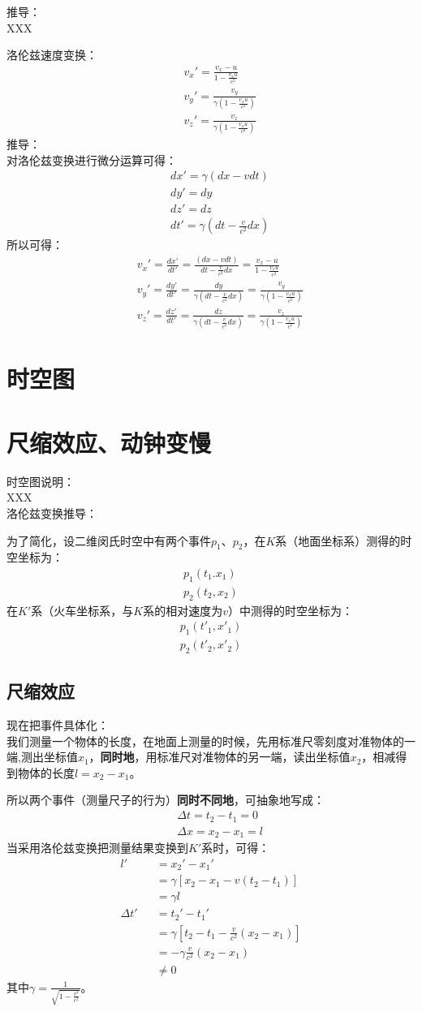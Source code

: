 \documentclass[11pt]{article}
\newcommand{\bea}{\setlength\arraycolsep{2pt} \begin{eqnarray}}
\newcommand{\eea}{\end{eqnarray}}
\numberwithin{equation}{section}
\begin{document}
\begin{CJK}{GBK}{song}
推导：\\

XXX

洛伦兹速度变换：
\bea
&&v_x'=\frac{v_x-u}{1-\frac{v_x u}{c^2}}\\
&&v_y'=\frac{v_y}{\gamma(1-\frac{v_x u}{c^2})}\\
&&v_z'=\frac{v_z}{\gamma(1-\frac{v_x u}{c^2})}
\eea
推导：\\
对洛伦兹变换进行微分运算可得：
\bea
&&dx'=\gamma(dx-v dt) \\
&&dy'=dy\\
&&dz'=dz\\
&&dt'=\gamma(dt-\frac{v}{c^2}dx)
\eea
所以可得：
\bea
&&v_x'=\frac{dx'}{dt'}=\frac{(dx-v dt)}{dt-\frac{v}{c^2}dx}=\frac{v_x-u}{1-\frac{v_x u}{c^2}} \\
&&v_y'=\frac{dy'}{dt'}=\frac{dy}{\gamma(dt-\frac{v}{c^2}dx)}=\frac{v_y}{\gamma(1-\frac{v_x u}{c^2})}\\
&&v_z'=\frac{dz'}{dt'}=\frac{dz}{\gamma(dt-\frac{v}{c^2}dx)}=\frac{v_z}{\gamma(1-\frac{v_x u}{c^2})}
\eea
\section{时空图}
\section{尺缩效应、动钟变慢}
时空图说明：\\
XXX\\
洛伦兹变换推导：


为了简化，设二维闵氏时空中有两个事件$p_1$、$p_2$，在$K$系（地面坐标系）测得的时空坐标为：
\bea
p_1(t_1.x_1)\\
p_2(t_2,x_2)
\eea
在$K'$系（火车坐标系，与$K$系的相对速度为$v$）中测得的时空坐标为：
\bea
p_1(t'_1,x'_1)\\
p_2(t'_2,x'_2)
\eea
\subsection{尺缩效应}
现在把事件具体化：\\
我们测量一个物体的长度，在地面上测量的时候，先用标准尺零刻度对准物体的一端,测出坐标值$x_1$，\textbf{同时地}，用标准尺对准物体的另一端，读出坐标值$x_2$，相减得到物体的长度$l=x_2-x_1$。

所以两个事件（测量尺子的行为）\textbf{同时不同地}，可抽象地写成：
\bea
&&\Delta t=t_2-t_1=0 \\
&&\Delta x =x_2-x_1=l
\eea
当采用洛伦兹变换把测量结果变换到$K'$系时，可得：
\bea
l'&&=x_2'-x_1' \\
&&=\gamma[x_2-x_1-v(t_2-t_1)]\\
&&=\gamma l \\
\Delta t'&&=t_2'-t_1' \\
&&=\gamma[t_2-t_1-\frac{v}{c^2}(x_2-x_1)]\\
&&=-\gamma\frac{v}{c^2}(x_2-x_1) \\
&&\not =0
\eea
其中$\gamma=\frac{1}{\sqrt{1-\frac{v^2}{c^2}}}$。


\end{CJK}
\end{document}
